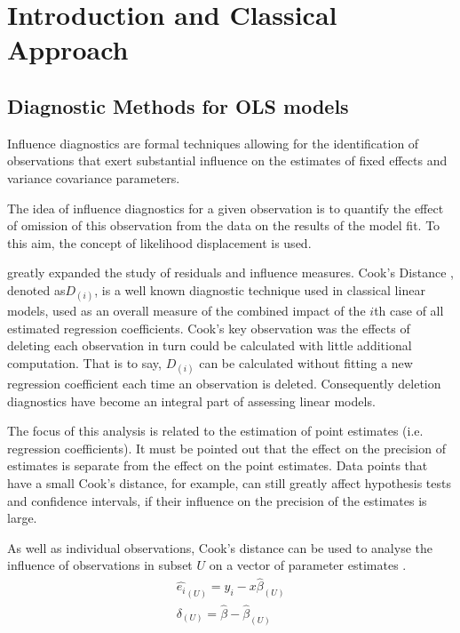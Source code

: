 \documentclass[Main.tex]{subfiles}
\begin{document}
	

\tableofcontents
	
	\newpage
	\section{Introduction and Classical Approach}
	\subsection{Diagnostic Methods for OLS models}
	Influence diagnostics are formal techniques allowing for the identification of observations that exert substantial 
	influence on the estimates of fixed effects and variance covariance parameters. 
	
	The idea of influence diagnostics for a given observation is to quantify the effect of omission of this observation 
	from the data on the results of the model fit. To this aim, the concept of likelihood displacement is used. 
	
	

\citet{cook77} greatly expanded the study of residuals and influence measures. Cook's Distance , denoted as$D_{(i)}$, is a well known diagnostic technique used in classical linear models, used as an overall measure of the combined impact of the $i$th case of all estimated regression coefficients. Cook's key observation was the effects of deleting each observation in turn could be calculated with little additional computation. That is to say, $D_{(i)}$ can be calculated without fitting a new regression coefficient each time an observation is deleted.  Consequently deletion diagnostics have become an integral part of assessing linear models. 


The focus of this analysis is related to the estimation of point estimates (i.e. regression coefficients). It must be pointed out that the effect on the precision of estimates is separate from the effect on the point estimates. Data points that
have a small Cook's distance, for example, can still greatly affect hypothesis tests and confidence intervals, if their  influence on the precision of the estimates is large.

As well as individual observations, Cook's distance can be used to analyse the influence of observations in subset $U$ on a vector of parameter estimates \citep{cook77}.
\begin{eqnarray}
\hat{e_{i}}_{(U)} = y_{i} - x\hat{\beta}_{(U)}\\
\delta_{(U)} = \hat{\beta} - \hat{\beta}_{(U)}
\end{eqnarray}
\end{document}
